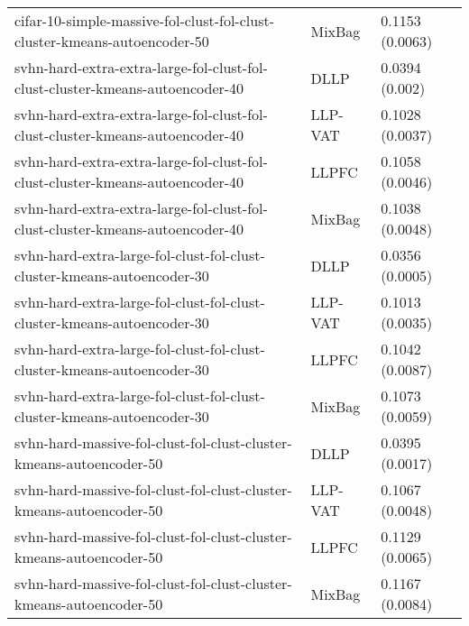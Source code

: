 \begin{longtable}{lll}
                                    cifar-10-simple-massive-fol-clust-fol-clust-cluster-kmeans-autoencoder-50 &    MixBag &                           0.1153 (0.0063) \\
                                svhn-hard-extra-extra-large-fol-clust-fol-clust-cluster-kmeans-autoencoder-40 &      DLLP &                            0.0394 (0.002) \\
                                svhn-hard-extra-extra-large-fol-clust-fol-clust-cluster-kmeans-autoencoder-40 &   LLP-VAT &                           0.1028 (0.0037) \\
                                svhn-hard-extra-extra-large-fol-clust-fol-clust-cluster-kmeans-autoencoder-40 &     LLPFC &                           0.1058 (0.0046) \\
                                svhn-hard-extra-extra-large-fol-clust-fol-clust-cluster-kmeans-autoencoder-40 &    MixBag &                           0.1038 (0.0048) \\
                                      svhn-hard-extra-large-fol-clust-fol-clust-cluster-kmeans-autoencoder-30 &      DLLP &                           0.0356 (0.0005) \\
                                      svhn-hard-extra-large-fol-clust-fol-clust-cluster-kmeans-autoencoder-30 &   LLP-VAT &                           0.1013 (0.0035) \\
                                      svhn-hard-extra-large-fol-clust-fol-clust-cluster-kmeans-autoencoder-30 &     LLPFC &                           0.1042 (0.0087) \\
                                      svhn-hard-extra-large-fol-clust-fol-clust-cluster-kmeans-autoencoder-30 &    MixBag &                           0.1073 (0.0059) \\
                                          svhn-hard-massive-fol-clust-fol-clust-cluster-kmeans-autoencoder-50 &      DLLP &                           0.0395 (0.0017) \\
                                          svhn-hard-massive-fol-clust-fol-clust-cluster-kmeans-autoencoder-50 &   LLP-VAT &                           0.1067 (0.0048) \\
                                          svhn-hard-massive-fol-clust-fol-clust-cluster-kmeans-autoencoder-50 &     LLPFC &                           0.1129 (0.0065) \\
                                          svhn-hard-massive-fol-clust-fol-clust-cluster-kmeans-autoencoder-50 &    MixBag &                           0.1167 (0.0084) \\

\end{longtable}
